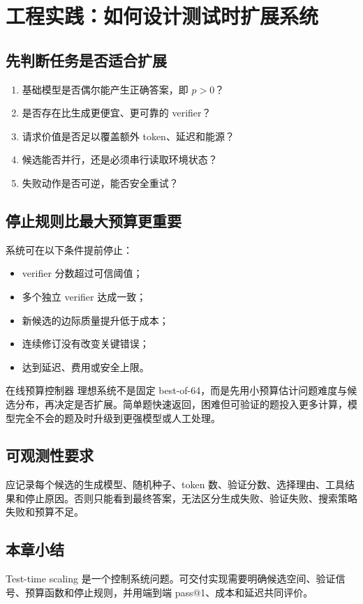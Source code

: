 \section{工程实践：如何设计测试时扩展系统}

\subsection{先判断任务是否适合扩展}

\begin{enumerate}
    \item 基础模型是否偶尔能产生正确答案，即 $p>0$？
    \item 是否存在比生成更便宜、更可靠的 verifier？
    \item 请求价值是否足以覆盖额外 token、延迟和能源？
    \item 候选能否并行，还是必须串行读取环境状态？
    \item 失败动作是否可逆，能否安全重试？
\end{enumerate}

\subsection{停止规则比最大预算更重要}

系统可在以下条件提前停止：

\begin{itemize}
    \item verifier 分数超过可信阈值；
    \item 多个独立 verifier 达成一致；
    \item 新候选的边际质量提升低于成本；
    \item 连续修订没有改变关键错误；
    \item 达到延迟、费用或安全上限。
\end{itemize}

\begin{importantbox}{在线预算控制器}
理想系统不是固定 best-of-64，而是先用小预算估计问题难度与候选分布，再决定是否扩展。简单题快速返回，困难但可验证的题投入更多计算，模型完全不会的题及时升级到更强模型或人工处理。
\end{importantbox}

\subsection{可观测性要求}

应记录每个候选的生成模型、随机种子、token 数、验证分数、选择理由、工具结果和停止原因。否则只能看到最终答案，无法区分生成失败、验证失败、搜索策略失败和预算不足。

\subsection{本章小结}

Test-time scaling 是一个控制系统问题。可交付实现需要明确候选空间、验证信号、预算函数和停止规则，并用端到端 pass@1、成本和延迟共同评价。

